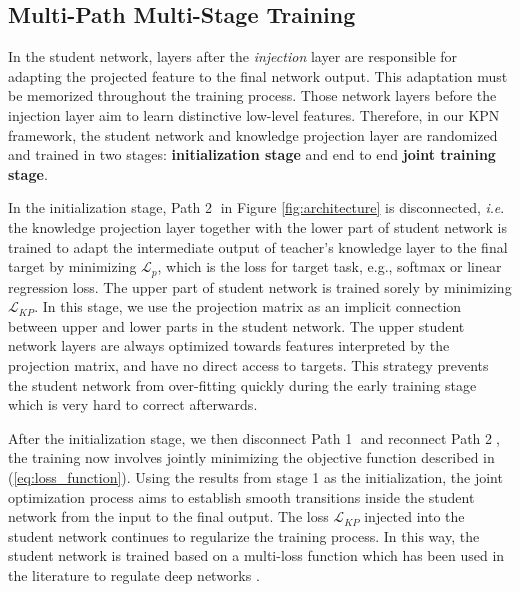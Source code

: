 \documentclass[journal]{IEEEtran}
\newcommand{\ie}{\textit{i}.\textit{e}. }
\begin{document}

\subsection{Multi-Path Multi-Stage Training}
In the student network, layers after the \textit{injection} layer are responsible for adapting the projected feature to the final network output. This adaptation must be memorized throughout the training process. Those network layers before the injection layer aim to learn distinctive low-level features. Therefore, in our KPN framework, the student network and knowledge projection layer are randomized and trained in two stages: \textbf{initialization stage} and end to end \textbf{joint training stage}. 

In the initialization stage, Path \textcircled{2} in Figure \ref{fig:architecture} is disconnected, \ie the knowledge projection layer together with the lower part of student network is trained to adapt the intermediate output of teacher's knowledge layer to the final target by minimizing $\mathcal{L}_p$, which is the loss for target task, e.g., softmax or linear regression loss.  The upper part of student network is trained sorely by minimizing $\mathcal{L}_{KP}$. In this stage, we use the projection matrix as an implicit connection between upper and lower parts in the student network. The upper student network layers are always optimized towards features interpreted by the projection matrix, and have no direct access to targets. This strategy prevents the student network from over-fitting quickly during the early training stage which is very hard to correct afterwards.

After the initialization stage, we then disconnect Path \textcircled{1} and reconnect Path \textcircled{2}, the training now involves jointly minimizing the objective function described in (\ref{eq:loss_function}). 
Using the results from stage 1 as the initialization, the joint optimization process aims to establish smooth transitions inside the student network from the input to the final output. The loss $\mathcal{L}_{KP}$ injected into the student network continues to regularize the training process. In this way, the student network is trained based on a multi-loss function which has been used in the literature to regulate deep networks \cite{xu2016multi}.
\end{document}
